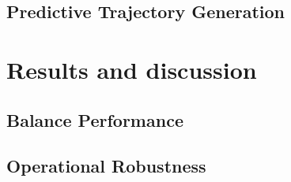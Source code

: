         \subsection{Predictive Trajectory Generation}
    
    \pagebreak{}


  \section{Results and discussion} %
    \subsection{Balance Performance}

    \subsection{Operational Robustness}
